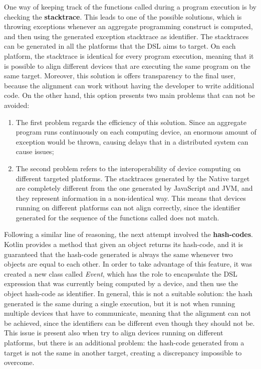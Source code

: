 One way of keeping track of the functions called during a program execution is by checking the \textbf{stacktrace}. This leads to one of the possible solutions, which is throwing exceptions whenever an aggregate programming construct is computed, and then using the generated exception stacktrace as identifier.\newline
The stacktraces can be generated in all the platforms that the DSL aims to target. On each platform, the stacktrace is identical for every program execution, meaning that it is possible to align different devices that are executing the same program on the same target.\newline
Moreover, this solution is offers transparency to the final user, because the alignment can work without having the developer to write additional code.\newline
On the other hand, this option presents two main problems that can not be avoided:
\begin{enumerate}
    \item The first problem regards the efficiency of this solution. Since an aggregate program runs continuously on each computing device, an enormous amount of exception would be thrown, causing delays that in a distributed system can cause issues;
    \item The second problem refers to the interoperability of device computing on different targeted platforms. The stacktraces generated by the Native target are completely different from the one generated by JavaScript and JVM, and they represent information in a non-identical way. This means that devices running on different platforms can not align correctly, since the identifier generated for the sequence of the functions called does not match.
\end{enumerate}

Following a similar line of reasoning, the next attempt involved the \textbf{hash-codes}. Kotlin provides a method that given an object returns its hash-code, and it is guaranteed that the hash-code generated is always the same whenever two objects are equal to each other. In order to take advantage of this feature, it was created a new class called \textit{Event}, which has the role to encapsulate the DSL expression that was currently being computed by a device, and then use the object hash-code as identifier. In general, this is not a suitable solution: the hash generated is the same during a single execution, but it is not when running multiple devices that have to communicate, meaning that the alignment can not be achieved, since the identifiers can be different even though they should not be.\newline
This issue is present also when try to align devices running on different platforms, but there is an additional problem: the hash-code generated from a target is not the same in another target, creating a discrepancy impossible to overcome.

